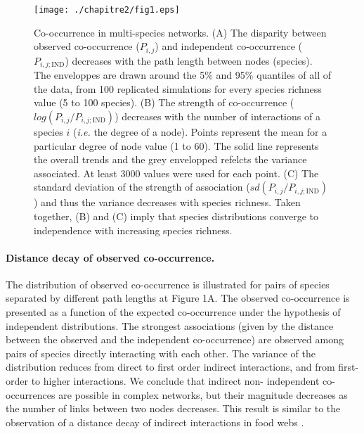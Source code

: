 \begin{figure}[h]
\texttt{[image: ./chapitre2/fig1.eps]}
\caption[Co-occurrence in multi-species networks]{Co-occurrence in multi-species networks.
(A) The disparity between observed co-occurrence ($P_{i,j}$) and independent co-occurrence ($P_{i,j;\text{IND}}$) decreases with the path length between nodes (species). The enveloppes are drawn around the 5\% and 95\% quantiles of all of the data, from 100 replicated simulations for every species richness value (5 to 100 species).
(B) The strength of co-occurrence ($log(P_{i,j}/P_{i,j;\text{IND}})$) decreases with the number of interactions of a species $i$ (\textit{i.e.} the degree of a node). Points represent the mean for a particular degree of node value (1 to 60). The solid line represents the overall trends and the grey envelopped refelcts the variance associated. At least 3000 values were used for each point.
(C) The standard deviation of the strength of association ($sd(P_{i,j}/P_{i,j;\text{IND}})$) and thus the variance decreases with species richness. Taken together, (B) and (C) imply that species distributions converge to independence with increasing species richness.}
\label{fig:1}
\end{figure}

\paragraph*{Distance decay of observed co-occurrence.} The distribution of
observed co-occurrence is illustrated for pairs of species separated by
different path lengths at Figure 1A. The observed co-occurrence is presented
as a function of the expected co-occurrence under the hypothesis of
independent distributions. The strongest associations (given by the distance
between the observed and the independent co-occurrence) are observed among
pairs of species directly interacting with each other. The variance of the
distribution reduces from direct to first order indirect interactions, and
from first-order to higher interactions. We conclude that indirect non-
independent co-occurrences are possible in complex networks, but their
magnitude decreases as the number of links between two nodes decreases. This
result is similar to the observation of a distance decay of indirect
interactions in food webs \citep{Berlow2009}.



